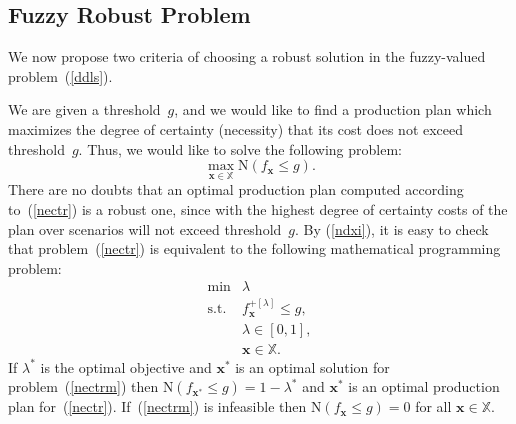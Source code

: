 \documentclass[11pt]{article}
\newcommand{\Xset}{\mathbb{X}}
\begin{document}
\subsection{Fuzzy Robust Problem}

We now propose  two  criteria of choosing a
robust solution in the fuzzy-valued
problem~(\ref{ddls}).

We are given a threshold~$g$, and we would like to find a production plan
which maximizes 
the degree of certainty (necessity)  that its cost does not exceed  threshold~$g$. Thus, we
would like to solve the following problem:
\begin{equation}
	\label{nectr}
	\max_{\pmb{x}\in \Xset}\mathrm{N}(f_{\pmb{x}}\leq g).
\end{equation}
There are no doubts that an optimal production plan computed according to~(\ref{nectr}) is
a robust one, since with the highest
degree of certainty  costs of the plan over scenarios 
will not exceed threshold~$g$. 
By (\ref{ndxi}), it is easy to check that problem~(\ref{nectr}) is equivalent to the following 
mathematical programming problem:
\begin{equation}
 \begin{array}{ll}
 \min &\lambda\\
 \text{s.t.} & f^{+[\lambda]}_{\pmb{x}}\leq 
   g,\\
       &\lambda\in [0,1],\\
       & \pmb{x}\in \Xset.
 \end{array}
 \label{nectrm}
\end{equation}
If $\lambda^{*}$ is the optimal objective and $\pmb{x}^{*}$ is an optimal solution for
problem~(\ref{nectrm}) 
then $\mathrm{N}(f_{\pmb{x}^{*}}\leq g)=1-\lambda^{*}$
and $\pmb{x}^{*}$ is an optimal production plan for~(\ref{nectr}).
 If~(\ref{nectrm}) is
infeasible then 
$\mathrm{N}(f_{\pmb{x}}\leq g)=0$ for all $\pmb{x}\in \Xset$. 
\end{document}
